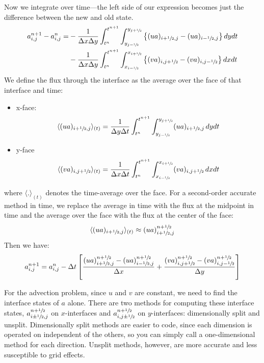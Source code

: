 Now we integrate over time---the left side of our expression becomes
just the difference between the new and old state.
\begin{align}
 a_{i,j}^{n+1} - a_{i,j}^n = 
  &- \frac{1}{\Delta x\Delta y} \int_{t^n}^{t^{n+1}} \int_{y_{j-{\sfrac{1}{2}}}}^{y_{j+{\sfrac{1}{2}}}}
     \left \{ (u a)_{i+{\sfrac{1}{2}},j} - (u a)_{i-{\sfrac{1}{2}},j} \right \} dy dt \nonumber \\
  &- \frac{1}{\Delta x\Delta y} \int_{t^n}^{t^{n+1}} \int_{x_{i-{\sfrac{1}{2}}}}^{x_{i+{\sfrac{1}{2}}}}
     \left \{ (v a)_{i,j+{\sfrac{1}{2}}} - (v a)_{i,j-{\sfrac{1}{2}}} \right \} dx dt
\label{eq:update2du}
\end{align}
We define the flux through the interface as the average over the face
of that interface and time: 
\begin{itemize}
\item x-face:
\begin{equation}
\langle (ua)_{i+{\sfrac{1}{2}},j}\rangle_{(t)} = \frac{1}{\Delta y \Delta t}
    \int_{t^n}^{t^{n+1}} \int_{y_{j-{\sfrac{1}{2}}}}^{y_{j+{\sfrac{1}{2}}}} (ua)_{i+{\sfrac{1}{2}},j}\, dy dt
\end{equation}
\item y-face
\begin{equation}
\langle (va)_{i,j+{\sfrac{1}{2}}}\rangle_{(t)} = \frac{1}{\Delta x \Delta t}
    \int_{t^n}^{t^{n+1}} \int_{x_{i-{\sfrac{1}{2}}}}^{x_{i+{\sfrac{1}{2}}}} (va)_{i,j+{\sfrac{1}{2}}}\, dx dt 
\end{equation}
\end{itemize}
where $\langle . \rangle_{(t)}$ denotes the time-average over the face.
For a second-order accurate method in time, we replace the average in
time with the flux at the midpoint in time and the average over the face
with the flux at the center of the face: 
\begin{equation}
\langle (ua)_{i+{\sfrac{1}{2}},j} \rangle_{(t)} \approx (ua)_{i+{\sfrac{1}{2}},j}^{n+{\sfrac{1}{2}}}
\end{equation}
Then we have:
\begin{equation}
a_{i,j}^{n+1} = a_{i,j}^n - \Delta t \left [
   \frac{(ua)_{i+{\sfrac{1}{2}},j}^{n+{\sfrac{1}{2}}} - (ua)_{i-{\sfrac{1}{2}},j}^{n+{\sfrac{1}{2}}}}{\Delta x} +
   \frac{(va)_{i,j+{\sfrac{1}{2}}}^{n+{\sfrac{1}{2}}} - (va)_{i,j-{\sfrac{1}{2}}}^{n+{\sfrac{1}{2}}}}{\Delta y} \right ]
\end{equation}

For the advection problem, since $u$ and $v$ are constant, we need
to find the interface states of $a$ alone.
There are two methods for computing these interface states, 
$a_{i\pm{\sfrac{1}{2}},j}^{n+{\sfrac{1}{2}}}$ on $x$-interfaces and  $a_{i,j\pm{\sfrac{1}{2}}}^{n+{\sfrac{1}{2}}}$ on $y$-interfaces:
dimensionally split and unsplit.  Dimensionally split methods are
easier to code, since each dimension is operated on independent of the
others, so you can simply call a one-dimensional method for each
direction.  Unsplit methods, however, are more accurate and less
susceptible to grid effects.  


